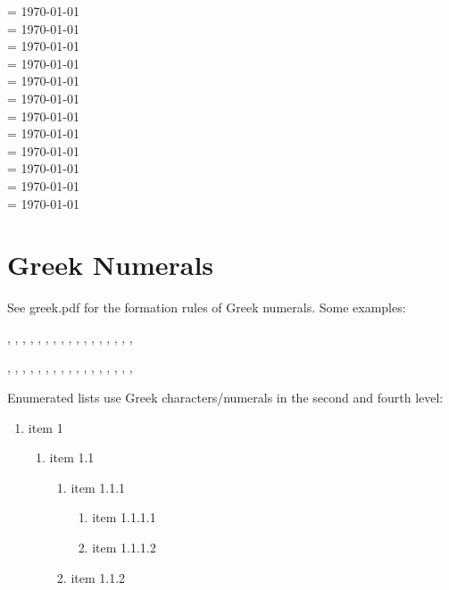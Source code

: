 \documentclass[a4paper]{article}
\begin{document}
 \month=\value{foo} \today \\
 \month=\value{foo} \today \\
 \month=\value{foo} \today \\
 \month=\value{foo} \today \\
 \month=\value{foo} \today \\
 \month=\value{foo} \today \\
 \month=\value{foo} \today \\
 \month=\value{foo} \today \\
 \month=\value{foo} \today \\
 \month=\value{foo} \today \\
 \month=\value{foo} \today \\
 \month=\value{foo} \today \\

\section{Greek Numerals}

See greek.pdf for the formation rules of Greek numerals.
Some examples:


,
,
,
,
,
,
,
,
,
,
,
,
,
,
,
,
,

,
,
,
,
,
,
,
,
,
,
,
,
,
,
,
,
,


Enumerated lists use Greek characters/numerals in the second and fourth level:

\begin{enumerate}
  \item \textlatin{item} 1
  \begin{enumerate}
    \item \textlatin{item} 1.1
    \begin{enumerate}
      \item \textlatin{item} 1.1.1
       \begin{enumerate}
         \item \textlatin{item} 1.1.1.1
         \item \textlatin{item} 1.1.1.2
       \end{enumerate}
      \item \textlatin{item} 1.1.2
    \end{enumerate}
  \end{enumerate}
\end{enumerate}
\end{document}
